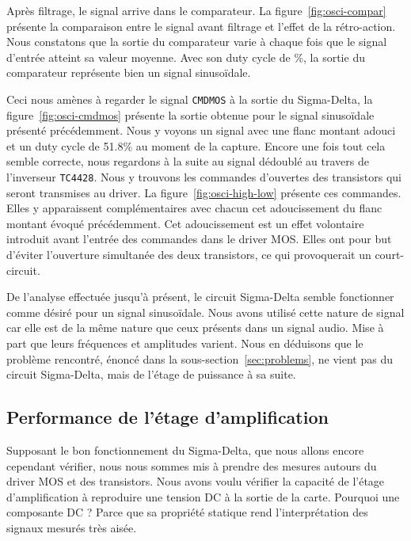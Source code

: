 \documentclass[10pt, oneside, a4paper]{article}
\begin{document}
Après filtrage, le signal arrive dans le comparateur.
La figure~\ref{fig:osci-compar} présente la comparaison entre le signal avant filtrage et l'effet de la rétro-action.
Nous constatons que la sortie du comparateur varie à chaque fois que le signal d'entrée atteint sa valeur moyenne.
Avec son duty cycle de \%, la sortie du comparateur représente bien un signal sinusoïdale.

Ceci nous amènes à regarder le signal \texttt{CMDMOS} à la sortie du Sigma-Delta, la figure~\ref{fig:osci-cmdmos} présente la sortie obtenue pour le signal sinusoïdale présenté précédemment.
Nous y voyons un signal avec une flanc montant adouci et un duty cycle de \num{51.8}\% au moment de la capture.
Encore une fois tout cela semble correcte, nous regardons à la suite au signal dédoublé au travers de l'inverseur \texttt{TC4428}.
Nous y trouvons les commandes d'ouvertes des transistors qui seront transmises au driver.
La figure~\ref{fig:osci-high-low} présente ces commandes.
Elles y apparaissent complémentaires avec chacun cet adoucissement du flanc montant évoqué précédemment.
Cet adoucissement est un effet volontaire introduit avant l'entrée des commandes dans le driver MOS.
Elles ont pour but d'éviter l'ouverture simultanée des deux transistors, ce qui provoquerait un court-circuit.

De l'analyse effectuée jusqu'à présent, le circuit Sigma-Delta semble fonctionner comme désiré pour un signal sinusoïdale.
Nous avons utilisé cette nature de signal car elle est de la même nature que ceux présents dans un signal audio.
Mise à part que leurs fréquences et amplitudes varient.
Nous en déduisons que le problème rencontré, énoncé dans la sous-section~\ref{sec:problems}, ne vient pas du circuit Sigma-Delta, mais de l'étage de puissance à sa suite.

\subsection{Performance de l'étage d'amplification}
Supposant le bon fonctionnement du Sigma-Delta, que nous allons encore cependant vérifier, nous nous sommes mis à prendre des mesures autours du driver MOS et des transistors.
Nous avons voulu vérifier la capacité de l'étage d'amplification à reproduire une tension DC à la sortie de la carte.
Pourquoi une composante DC ?
Parce que sa propriété statique rend l'interprétation des signaux mesurés très aisée.
\end{document}
